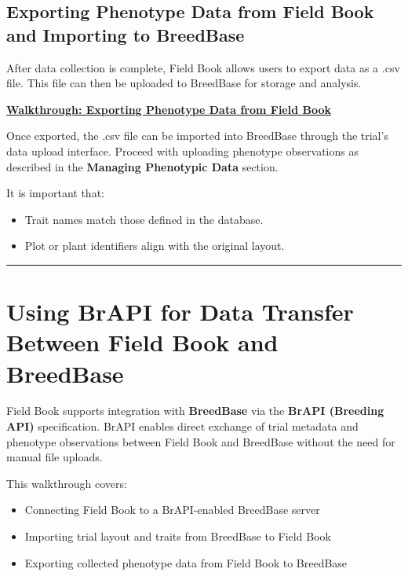 \documentclass[
  12pt,
]{book}
\providecommand{\tightlist}{%
  \setlength{\itemsep}{0pt}\setlength{\parskip}{0pt}}
\begin{document}
\hypertarget{exporting-phenotype-data-from-field-book-and-importing-to-breedbase}{%
\subsection{Exporting Phenotype Data from Field Book and Importing to BreedBase}\label{exporting-phenotype-data-from-field-book-and-importing-to-breedbase}}

After data collection is complete, Field Book allows users to export data as a .csv file. This file can then be uploaded to BreedBase for storage and analysis.

\href{https://scribehow.com/shared/Exporting_Phenotype_Data_in_FieldBook__ToUuuA3YTYGclEg7SDArLg}{\textbf{Walkthrough: Exporting Phenotype Data from Field Book}}

Once exported, the .csv file can be imported into BreedBase through the trial's data upload interface. Proceed with uploading phenotype observations as described in the \textbf{Managing Phenotypic Data} section.

It is important that:

\begin{itemize}
\tightlist
\item
  Trait names match those defined in the database.
\item
  Plot or plant identifiers align with the original layout.
\end{itemize}

\begin{center}\rule{0.5\linewidth}{0.5pt}\end{center}

\hypertarget{using-brapi-for-data-transfer-between-field-book-and-breedbase}{%
\section{Using BrAPI for Data Transfer Between Field Book and BreedBase}\label{using-brapi-for-data-transfer-between-field-book-and-breedbase}}

Field Book supports integration with \textbf{BreedBase} via the \textbf{BrAPI (Breeding API)} specification. BrAPI enables direct exchange of trial metadata and phenotype observations between Field Book and BreedBase without the need for manual file uploads.

This walkthrough covers:

\begin{itemize}
\tightlist
\item
  Connecting Field Book to a BrAPI-enabled BreedBase server
\item
  Importing trial layout and traits from BreedBase to Field Book
\item
  Exporting collected phenotype data from Field Book to BreedBase
\end{itemize}
\end{document}
